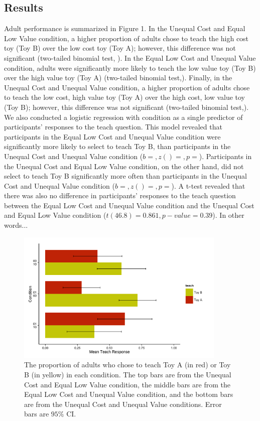 \documentclass[10pt,letterpaper]{article}
\begin{document}
\subsection{Results}

Adult performance is summarized in Figure 1. In the Unequal Cost and Equal Low Value condition, a higher proportion of adults chose to teach the high cost toy (Toy B) over the low cost toy (Toy A); however, this difference was not significant (two-tailed binomial test, ). In the Equal Low Cost and Unequal Value condition, adults were significantly more likely to teach the low value toy (Toy B) over the high value toy (Toy A) (two-tailed binomial test,). Finally, in the Unequal Cost and Unequal Value condition, a higher proportion of adults chose to teach the low cost, high value toy (Toy A) over the high cost, low value toy (Toy B); however, this difference was not significant (two-tailed binomial test,). We also conducted a logistic regression with condition as a single predictor of participants' responses to the teach question. This model revealed that participants in the Equal Low Cost and Unequal Value condition were significantly more likely to select to teach Toy B, than participants in the Unequal Cost and Unequal Value condition ($b = , z() = , p = $). Participants in the Unequal Cost and Equal Low Value condition, on the other hand, did not select to teach Toy B significantly more often than participants in the Unequal Cost and Unequal Value condition ($b = , z() = , p = $). A t-test revealed that there was also no difference in participants' responses to the teach question between the Equal Low Cost and Unequal Value condition and the Unequal Cost and Equal Low Value condition ($t(46.8) = 0.861,  p-value = 0.39$). In other words...

\begin{figure}[ht]
\begin{center}
\includegraphics[width=10cm]{cleanHorizontalBarplot_n87.png}
\end{center}
\caption{The proportion of adults who chose to teach Toy A (in red) or Toy B (in yellow) in each condition. The top bars are from the Unequal Cost and Equal Low Value condition, the middle bars are from the Equal Low Cost and Unequal Value condition, and the bottom bars are from the Unequal Cost and Unequal Value conditions. Error bars are $95\%$ CI.} 
\label{Figure 1}
\end{figure}
\end{document}
